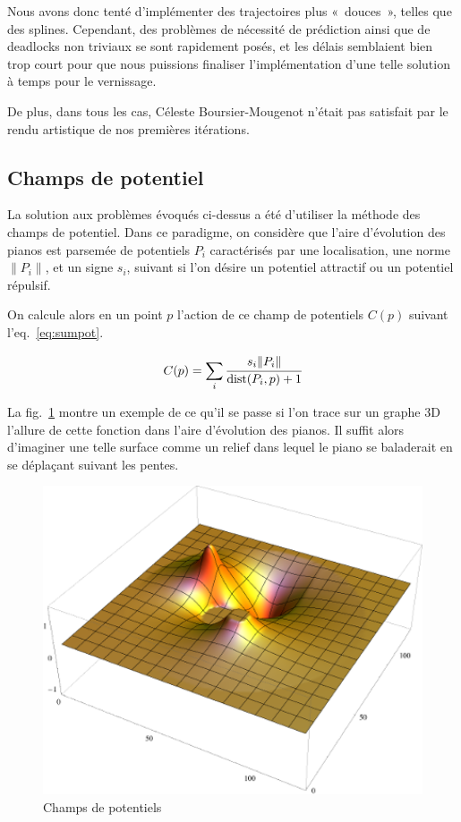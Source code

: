 \documentclass[french,A4paper,]{book}
\begin{document}
Nous avons donc tenté d'implémenter des trajectoires plus «~douces~»,
telles que des splines. Cependant, des problèmes de nécessité de
prédiction ainsi que de deadlocks non triviaux se sont rapidement posés,
et les délais semblaient bien trop court pour que nous puissions
finaliser l'implémentation d'une telle solution à temps pour le
vernissage.

De plus, dans tous les cas, Céleste Boursier-Mougenot n'était pas
satisfait par le rendu artistique de nos premières itérations.

\subsection{Champs de potentiel}\label{sec:potentiels}

La solution aux problèmes évoqués ci-dessus a été d'utiliser la méthode
des champs de potentiel. Dans ce paradigme, on considère que l'aire
d'évolution des pianos est parsemée de potentiels \(P_i\) caractérisés
par une localisation, une norme \(\|P_i\|\), et un signe \(s_i\),
suivant si l'on désire un potentiel attractif ou un potentiel répulsif.

On calcule alors en un point \(p\) l'action de ce champ de potentiels
\(C(p)\) suivant l'eq.~\ref{eq:sumpot}.

\begin{equation} C(p) = \sum_i \cfrac{s_i \|P_i\|}{\mathrm{dist}(P_i, p) + 1} \label{eq:sumpot}\end{equation}

La fig.~\ref{fig:surface} montre un exemple de ce qu'il se passe si l'on
trace sur un graphe 3D l'allure de cette fonction dans l'aire
d'évolution des pianos. Il suffit alors d'imaginer une telle surface
comme un relief dans lequel le piano se baladerait en se déplaçant
suivant les pentes.

\begin{figure}
\centering
\includegraphics[width=1.00000\textwidth]{imgs/surface.png}
\caption{Champs de potentiels}\label{fig:surface}
\end{figure}
\end{document}
